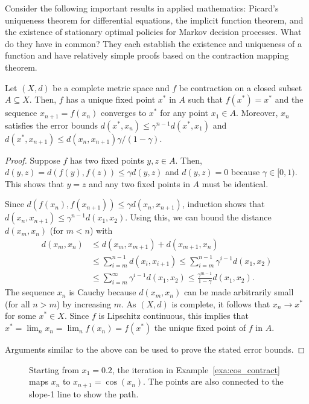 Consider the following important results in applied mathematics: Picard's uniqueness theorem for differential equations, the implicit function theorem, and the existence of stationary optimal policies for Markov decision processes.
What do they have in common?
They each establish the existence and uniqueness of a function and have relatively simple proofs based on the contraction mapping theorem.

\begin{theorem}
Let $(X,d)$ be a complete metric space and $f$ be contraction on a closed subset $A \subseteq X$.
Then, $f$ has a unique fixed point $x^*$ in $A$ such that $f(x^*) = x^*$ and the sequence $x_{n+1} = f(x_n)$ converges to $x^*$ for any point $x_1 \in A$.  Moreover, $x_n$ satisfies the error bounds $d(x^*,x_n) \leq \gamma^{n-1} d(x^*,x_1)$ and $d(x^*,x_{n+1}) \leq d(x_n,x_{n+1})\gamma /(1-\gamma)$.
\end{theorem}
\begin{proof}
Suppose $f$ has two fixed points $y,z\in A$.
Then, $d(y,z) = d \left(f(y),f(z) \right) \leq \gamma  d(y,z)$ and $d(y,z) = 0$ because $\gamma \in [0,1)$.
This shows that $y=z$ and any two fixed points in $A$ must be identical.

Since $d(f(x_n),f(x_{n+1})) \leq \gamma d(x_n,x_{n+1})$, induction shows that $d(x_n,x_{n+1}) \leq \gamma^{n-1} d(x_1,x_2)$.
Using this, we can bound the distance $d(x_m,x_n)$ (for $m<n$) with
\begin{align*}
d(x_m,x_n)
& \leq d(x_m,x_{m+1}) + d(x_{m+1},x_n) \\
& \leq \sum_{i=m}^{n-1} d(x_i,x_{i+1}) 
 \leq \sum_{i=m}^{n-1} \gamma^{i-1} d(x_1,x_2) \\
& \leq \sum_{i=m}^\infty \gamma^{i-1} d(x_1,x_2) 
 \leq \frac{\gamma^{m-1}}{1-\gamma} d(x_1,x_2).
\end{align*}
The sequence $x_n$ is Cauchy because $d(x_m,x_n)$ can be made arbitrarily small (for all $n>m$) by increasing $m$.
As $(X,d)$ is complete, it follows that $x_n \to x^*$ for some $x^* \in X$.
Since $f$ is Lipschitz continuous, this implies that $x^* = \lim_n x_n = \lim_n f(x_n) = f(x^*)$ the unique fixed point of $f$ in $A$.

Arguments similar to the above can be used to prove the stated error bounds.
\end{proof}

\begin{figure}[t]
\centering

\vspace{-5mm}
\caption{\label{fig:cos_contract}Starting from $x_1 = 0.2$, the iteration in Example~\ref{exa:cos_contract} maps $x_n$ to $x_{n+1}= \cos(x_n)$.  The points are also connected to the slope-1 line to show the path.}
\end{figure}

